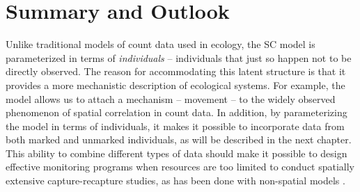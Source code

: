 \section{Summary and Outlook}

Unlike traditional models of count data used in ecology, the SC model
is parameterized in terms of \textit{individuals} -- individuals that just so
happen not to be directly observed. The reason for accommodating this
latent structure is that it provides a more mechanistic description
of ecological systems. For example, the model allows us to attach a
mechanism -- movement -- to the widely observed phenomenon of spatial
correlation in count data. In addition, by parameterizing the model in
terms of individuals, it makes it possible to incorporate data from
both marked and unmarked individuals, as will be described in the next
chapter. This ability to combine different
types of data should make it possible to
design effective monitoring programs when resources are too limited to
conduct spatially extensive capture-recapture
studies, as has been done 
with non-spatial models \citep{conroy_etal:2008}.

